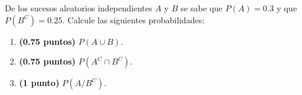 
De los sucesos aleatorios independientes $A$ y $B$ se sabe que $P(A)=0.3$ y que $P(B^C)=0.25$. Calcule las siguientes probabilidades:
\begin{enumerate}[label=\alph*)]
\item \textbf{(0.75 puntos)} $P(A\cup B)$.
\item \textbf{(0.75 puntos)} $P(A^C\cap B^C)$.
\item \textbf{(1 punto)} $P(A/B^C)$.
\end{enumerate}
